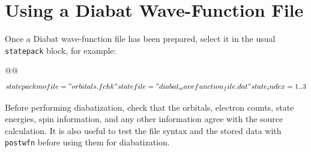 \section{Using a Diabat Wave-Function File}
Once a Diabat wave-function file has been prepared, select it in the usual \texttt{statepack} block, for example:
\begin{lst-script}[escapechar=@]
@@
$$statepack
    mofile = "orbitals.fchk"
    statefile = "diabat_wavefunction_file.dat"
    state_index = 1..3
$$
\end{lst-script}
Before performing diabatization, check that the orbitals, electron counts, state energies, spin information, and any other information agree with the source calculation. It is also useful to test the file syntax and the stored data with \texttt{postwfn} before using them for diabatization.

